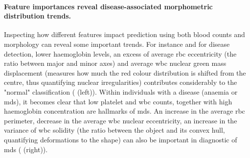 \begin{figure}[!ht]
    \label{fig:roc-curves-binary}
\end{figure}

\begin{figure}[!ht]
    \label{fig:auc-binary}
\end{figure}

\paragraph{Feature importances reveal disease-associated morphometric distribution trends.} Inspecting how different features impact prediction using both blood counts and morphology can reveal some important trends. For instance and for disease detection, lower haemoglobin levels, an excess of average \ac{rbc} eccentricity (the ratio between major and minor axes) and average \ac{wbc} nuclear green mass displacement (measures how much the red colour distribution is shifted from the centre, thus quantifying nuclear irregularities) contributes considerably to the "normal" classification ( (left)). Within individuals with a disease (anaemia or \ac{mds}), it becomes clear that low platelet and \ac{wbc} counts, together with high haemoglobin concentration are hallmarks of \ac{mds}. An increase in the average \ac{rbc} perimeter, decrease in the average \ac{wbc} nuclear eccentricity, an increase in the variance of \ac{wbc} solidity (the ratio between the object and its convex hull, quantifying deformations to the shape) can also be important in diagnostic of \ac{mds} ( (right)).

\begin{figure}[!ht]
    \label{fig:feature-importance-disease-detection-classification}
\end{figure}

